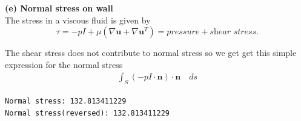 \documentclass[11pt,a4paper,english]{article}
\numberwithin{equation}{section}
\begin{document}
\textbf{(e) Normal stress on wall} \\

The stress in a viscous fluid is given by 
\begin{equation}
\tau = -pI + \mu (\nabla \mathbf{u}  + \nabla \mathbf{u}^T  ) = pressure + \textit{shear stress}. 
\end{equation}

The shear stress does not contribute to normal stress so we get get this simple expression for the normal stress
\begin{align*}
\int_{S} (-p I \cdot \mathbf{n} ) \cdot \mathbf{n} \quad ds
\end{align*}

\texttt{Normal stress:  132.813411229} \\
\texttt{Normal stress(reversed):  132.813411229 }
\end{document}
